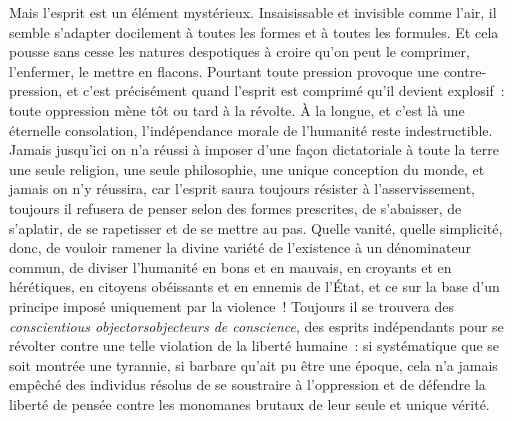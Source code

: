 \documentclass[french,twoside]{book} %
\newcommand\foreign[1]{\emph{#1}}
\begin{document}
Mais l’esprit est un élément mystérieux. Insaisissable et invisible comme l’air, il semble s’adapter docilement à toutes les formes et à toutes les formules. Et cela pousse sans cesse les natures despotiques à croire qu’on peut le comprimer, l’enfermer, le mettre en flacons. Pourtant toute pression provoque une contre-pression, et c’est précisément quand l’esprit est comprimé qu’il devient explosif : toute oppression mène tôt ou tard à la révolte. À la longue, et c’est là une éternelle consolation, l’indépendance morale de l’humanité reste indestructible. Jamais jusqu’ici on n’a réussi à imposer d’une façon dictatoriale à toute la terre une seule religion, une seule philosophie, une unique conception du monde, et jamais on n’y réussira, car l’esprit saura toujours résister à l’asservissement, toujours il refusera de penser selon des formes prescrites, de s’abaisser, de s’aplatir, de se rapetisser et de se mettre au pas. Quelle vanité, quelle simplicité, donc, de vouloir ramener la divine variété de l’existence à un dénominateur commun, de diviser l’humanité en bons et en mauvais, en croyants et en hérétiques, en citoyens obéissants et en ennemis de l’État, et ce sur la base d’un principe imposé uniquement par la violence ! Toujours il se trouvera des \foreign{conscientious objectorsobjecteurs de conscience}, des esprits indépendants pour se révolter contre une telle violation de la liberté humaine : si systématique que se soit montrée une tyrannie, si barbare qu’ait pu être une époque, cela n’a jamais empêché des individus résolus de se soustraire à l’oppression et de défendre la liberté de pensée contre les monomanes brutaux de leur seule et unique vérité.\par
\end{document}
